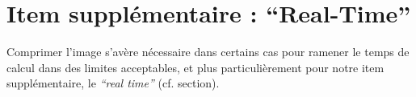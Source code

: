 \section{Item supplémentaire : ``Real-Time''}

Comprimer l'image s'avère nécessaire dans certains cas pour ramener le temps de calcul dans des limites acceptables, et plus particulièrement pour notre item supplémentaire, le \textit{``real time''} (cf. section).%



 